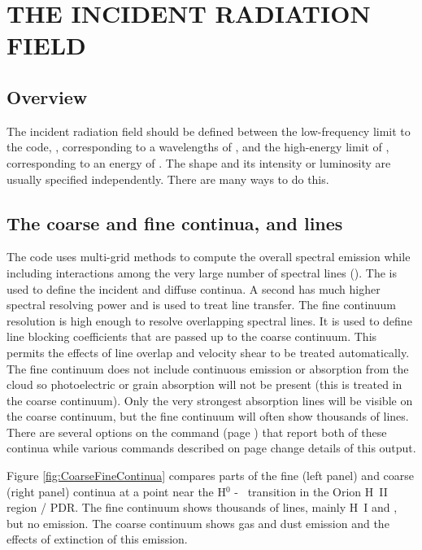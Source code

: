 \chapter{THE INCIDENT RADIATION FIELD}

\section{Overview}

The incident radiation field should be defined between the low-frequency limit
to the code, \emmmhz, corresponding to a wavelengths of \emmcm,
and the high-energy limit of \egamry, corresponding to an energy of \egamrymev.
The shape and its intensity or luminosity are usually specified
independently.
There are many ways to do this.

\section{The coarse and fine continua, and lines}
\label{sec:CoarseFineContinuaLines}

The code uses multi-grid methods to compute the overall spectral emission while
including  interactions among the
very large number of spectral lines (\citealp{Shaw2005}).  
The  is used to define the
incident and diffuse continua.
A second  has much higher spectral resolving power and
is used to treat line transfer.
The fine continuum resolution is high enough to resolve overlapping spectral
lines.  
It is used to define line blocking coefficients that are passed up to the coarse continuum.  
This permits the effects of line overlap and velocity shear to be treated automatically.
The fine continuum does not include continuous
emission or absorption from the cloud so photoelectric or grain absorption will not be present
(this is treated in the coarse continuum).  
Only the very strongest absorption lines will be visible on the coarse continuum, but
the fine continuum will often show thousands of lines.
There are several options
on the  command 
(page \pageref{sec:CommandSaveContinuum}) that report both of these continua
while various  commands described on 
page \pageref{sec:CommandSetContinuumOptions} change details of this output.

Figure \ref{fig:CoarseFineContinua} compares parts of the fine (left panel) and
coarse (right panel) continua at a point near the H$^0$ - \htwo\ transition in 
the Orion H~II region / PDR.  
The fine continuum shows thousands of lines, mainly H~I and \htwo, but no emission.
The coarse continuum shows gas and dust emission and the effects of extinction of this emission.

